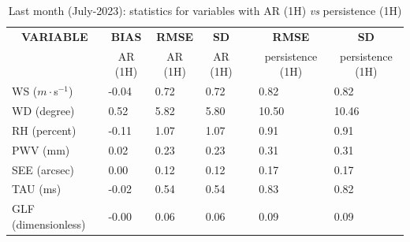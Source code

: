 \begin{table}[]
\begin{center}
\begin{tabular}{|l|l|l|l|l|l|l|}
\hline
\multicolumn{1}{|c|}{\cellcolor[HTML]{C0C0C0}\textbf{VARIABLE}} & \multicolumn{1}{c|}{\cellcolor[HTML]{C0C0C0}\textbf{BIAS}} & \multicolumn{1}{c|}{\cellcolor[HTML]{C0C0C0}\textbf{RMSE}} & \multicolumn{1}{c|}{\cellcolor[HTML]{C0C0C0}\textbf{SD}} & & \multicolumn{1}{c|}{\cellcolor[HTML]{C0C0C0}\textbf{RMSE}} & \multicolumn{1}{c|}{\cellcolor[HTML]{C0C0C0}\textbf{SD}}\\
\multicolumn{1}{|c|}{\cellcolor[HTML]{C0C0C0}} & \multicolumn{1}{c|}{\cellcolor[HTML]{C0C0C0}AR (1H)} & \multicolumn{1}{c|}{\cellcolor[HTML]{C0C0C0}AR (1H)} & \multicolumn{1}{c|}{\cellcolor[HTML]{C0C0C0}AR (1H)} & & \multicolumn{1}{c|}{\cellcolor[HTML]{C0C0C0}persistence (1H)} & \multicolumn{1}{c|}{\cellcolor[HTML]{C0C0C0}persistence (1H)}\\\hline
\cellcolor[HTML]{C0C0C0}WS ($m\cdot$s$^{-1}$) &     -0.04  &      0.72  &      0.72  & &      0.82  &      0.82\\
\cellcolor[HTML]{C0C0C0}WD (degree)           &      0.52  &      5.82  &      5.80  & &     10.50  &     10.46\\
\cellcolor[HTML]{C0C0C0}RH (percent)          &     -0.11  &      1.07  &      1.07  & &      0.91  &      0.91\\
\cellcolor[HTML]{C0C0C0}PWV (mm)              &      0.02 &      0.23 &      0.23 & &      0.31 &      0.31\\
\cellcolor[HTML]{C0C0C0}SEE (arcsec)          &      0.00 &      0.12 &      0.12 & &      0.17 &      0.17\\
\cellcolor[HTML]{C0C0C0}TAU (ms)              &     -0.02 &      0.54 &      0.54 & &      0.83 &      0.82\\
\cellcolor[HTML]{C0C0C0}GLF (dimensionless)   &     -0.00 &      0.06 &      0.06 & &      0.09 &      0.09\\
\hline
\end{tabular}
\caption{Last month (July-2023): statistics for variables with AR (1H) \textit{vs} persistence (1H)}
\end{center}
\end{table}

